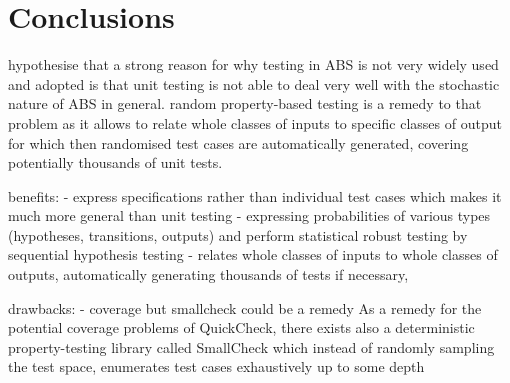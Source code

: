\section{Conclusions}
\label{sec:conclusions}
hypothesise that a strong reason for why testing in ABS is not very widely used and adopted is that unit testing is not able to deal very well with the stochastic nature of ABS in general. random property-based testing is a remedy to that problem as it allows to relate whole classes of inputs to specific classes of output for which then randomised test cases are automatically generated, covering potentially thousands of unit tests.

benefits:
- express specifications rather than individual test cases which makes it much more general than unit testing
- expressing probabilities of various types (hypotheses, transitions, outputs) and perform statistical robust testing by sequential hypothesis testing
- relates whole classes of inputs to whole classes of outputs, automatically generating thousands of tests if necessary, 

drawbacks:
- coverage but smallcheck could be a remedy
As a remedy for the potential coverage problems of QuickCheck, there exists also a deterministic property-testing library called SmallCheck \cite{runciman_smallcheck_2008} which instead of randomly sampling the test space, enumerates test cases exhaustively up to some depth